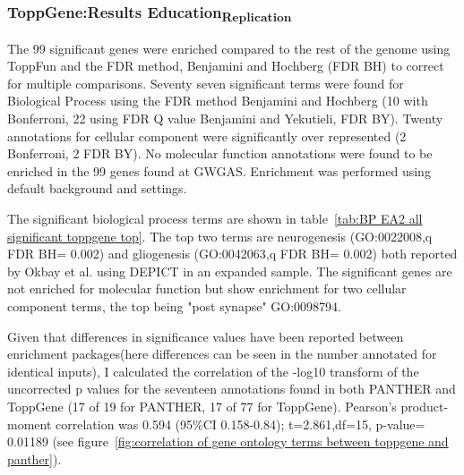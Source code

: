




\subsubsection{ToppGene:Results Education\textsubscript{Replication}}

The 99 significant genes were enriched compared to the rest of the genome  using ToppFun and the FDR method, Benjamini and Hochberg (FDR BH) to correct for multiple comparisons. Seventy seven significant terms were found for Biological Process using the FDR method Benjamini and Hochberg (10 with Bonferroni, 22 using FDR Q value Benjamini and Yekutieli, FDR BY). Twenty annotations for cellular component were significantly over represented (2 Bonferroni, 2 FDR BY). No molecular function annotations were found to be enriched in the 99 genes found at GWGAS. Enrichment was performed using default background and settings. 


The significant biological process terms are shown in  table~\ref{tab:BP EA2 all significant toppgene top}. The top two terms are neurogenesis (GO:0022008,q FDR BH= 0.002) and gliogenesis (GO:0042063,q FDR BH= 0.002) both reported by Okbay et al. using DEPICT in an expanded sample\cite{okbay2016genome}. The significant genes are not enriched for molecular function but show enrichment for two cellular component terms, the top being "post synapse" GO:0098794.

Given that differences in significance values have been reported between enrichment packages\cite{khatri2005ontological}(here differences can be seen in the number annotated for identical inputs), I calculated  the correlation of the -log10 transform of the uncorrected p values for the seventeen annotations found in both PANTHER and ToppGene (17 of 19 for PANTHER, 17 of 77 for ToppGene). Pearson's product-moment correlation was 0.594 (95\%CI 0.158-0.84); t=2.861,df=15, p-value= 0.01189 (see figure~\ref{fig:correlation of gene ontology terms between toppgene and panther}). 

